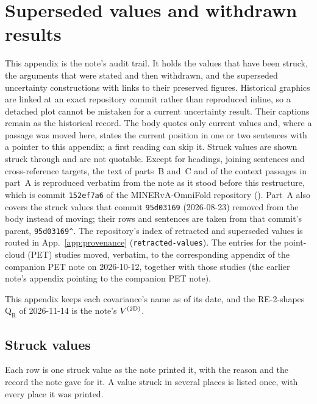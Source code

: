 \section{Superseded values and withdrawn results}
\label{app:history}

This appendix is the note's audit trail. It holds the values that have been struck, the arguments that were stated and then withdrawn, and the superseded uncertainty constructions with links to their preserved figures. Historical graphics are linked at an exact repository commit rather than reproduced inline, so a detached plot cannot be mistaken for a current uncertainty result. Their captions remain as the historical record. The body quotes only current values and, where a passage was moved here, states the current position in one or two sentences with a pointer to this appendix; a first reading can skip it. Struck values are shown struck through and are not quotable. Except for headings, joining sentences and cross-reference targets, the text of parts~B and~C and of the context passages in part~A is reproduced verbatim from the note as it stood before this restructure, which is commit \texttt{152ef7a6} of the MINERvA-OmniFold repository (\repolink). Part~A also covers the struck values that commit \texttt{95d03169} (2026-08-23) removed from the body instead of moving; their rows and sentences are taken from that commit's parent, \texttt{95d03169\^{}}. The repository's index of retracted and superseded values is routed in App.~\ref{app:provenance} (\texttt{retracted-values}). The entries for the point-cloud (PET) studies moved, verbatim, to the corresponding appendix of the companion PET note on 2026-10-12, together with those studies (the earlier note's appendix pointing to the companion PET note).

This appendix keeps each covariance's name as of its date, and the RE-2-shapes $\mathrm{Q_R}$ of 2026-11-14 is the note's $V^{(2\mathrm{D})}$.

\subsection{Struck values}
\label{app:history-errata}

Each row is one struck value as the note printed it, with the reason and the record the note gave for it. A value struck in several places is listed once, with every place it was printed.

